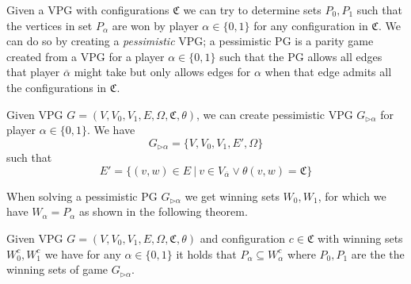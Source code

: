 Given a VPG with configurations $\mathfrak{C}$ we can try to determine sets $P_0,P_1$ such that the vertices in set $P_\alpha$ are won by player $\alpha \in \{0,1\}$ for any configuration in $\mathfrak{C}$. We can do so by creating a \textit{pessimistic} VPG; a pessimistic PG is a parity game created from a VPG for a player $\alpha \in \{0,1\}$ such that the PG allows all edges that player $\overline{\alpha}$ might take but only allows edges for $\alpha$ when that edge admits all the configurations in $\mathfrak{C}$.
\begin{definition}
	\label{def_pess_game}
	Given VPG $G = (V,V_0,V_1,E,\Omega, \mathfrak{C},\theta)$, we can create pessimistic VPG $G_{\triangleright\alpha}$ for player $\alpha \in \{0,1\}$. We have	
	\[ G_{\triangleright\alpha} = \{V,V_0,V_1,E',\Omega \} \]
	such that
	\[ E' = \{ (v,w) \in E\ |\ v \in V_{\overline{\alpha}} \vee \theta(v,w) = \mathfrak{C} \} \]
\end{definition}

When solving a pessimistic PG $G_{\triangleright\alpha}$ we get winning sets $W_0,W_1$, for which we have $W_\alpha = P_\alpha$ as shown in the following theorem.
\begin{theorem}
	Given VPG $G = (V,V_0,V_1,E,\Omega,\mathfrak{C},\theta)$ and configuration $c \in \mathfrak{C}$ with winning sets $W_0^c, W_1^c$ we have for any $\alpha \in \{0,1\}$ it holds that $P_\alpha \subseteq W_\alpha^c$ where $P_0,P_1$ are the the winning sets of game $G_{\triangleright\alpha}$.
\end{theorem}